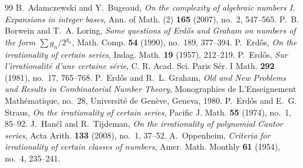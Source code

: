 \documentclass[10pt,a4paper]{amsart}
\begin{document}
\begin{thebibliography}{99}
 B.~Adamczewski and Y.~Bugeaud, \emph{On the complexity of algebraic numbers I. Expansions in integer bases}, Ann. of Math. (2) \textbf{165} (2007), no.~2, 547--565.
 P.~B. Borwein and T.~A. Loring, \emph{Some questions of Erd\H{o}s and Graham on numbers of the form $\sum g_n/2^{g_n}$}, Math. Comp. \textbf{54} (1990), no.~189, 377--394.
 P.~Erd\H{o}s, \emph{On the irrationality of certain series}, Indag. Math. \textbf{19} (1957), 212--219.
 P.~Erd\H{o}s, \emph{Sur l'irrationalit\'e d'une certaine s\'erie}, C. R. Acad. Sci. Paris S\'er. I Math. \textbf{292} (1981), no.~17, 765--768.
 P.~Erd\H{o}s and R.~L. Graham, \emph{Old and New Problems and Results in Combinatorial Number Theory}, Monographies de L'Enseignement Math\'ematique, no.~28, Universit\'e de Gen\`eve, Geneva, 1980.
 P.~Erd\H{o}s and E.~G. Straus, \emph{On the irrationality of certain series}, Pacific J. Math. \textbf{55} (1974), no.~1, 85--92.
 J.~Han\v{c}l and R.~Tijdeman, \emph{On the irrationality of polynomial Cantor series}, Acta Arith. \textbf{133} (2008), no.~1, 37--52.
 A.~Oppenheim, \emph{Criteria for irrationality of certain classes of numbers}, Amer. Math. Monthly \textbf{61} (1954), no.~4, 235--241.
\end{thebibliography}
\end{document}
